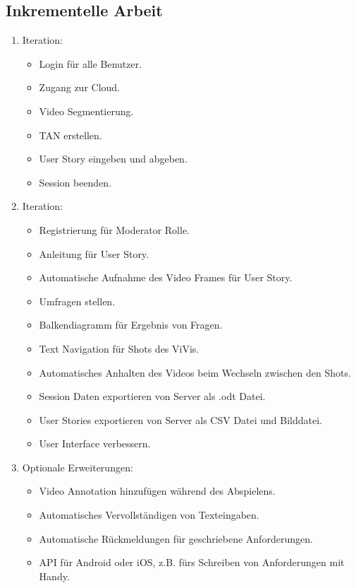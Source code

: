 	\subsection{Inkrementelle Arbeit}
		\begin{enumerate}
			\item Iteration:
			\begin{itemize}
				\item Login für alle Benutzer.
				\item Zugang zur Cloud.
				\item Video Segmentierung.
				\item TAN erstellen.
				\item User Story eingeben und abgeben.
				\item Session beenden.
			\end{itemize}
			\item Iteration:
			\begin{itemize}
				\item Registrierung für Moderator Rolle.
				\item Anleitung für User Story.
				\item Automatische Aufnahme des Video Frames für User Story.
				\item Umfragen stellen.
				\item Balkendiagramm für Ergebnis von Fragen.
				\item Text Navigation für Shots des ViVis.
				\item Automatisches Anhalten des Videos beim Wechseln zwischen den Shots.
				\item Session Daten exportieren von Server als .odt Datei.
				\item User Stories exportieren von Server als CSV Datei und Bilddatei.
				\item User Interface verbessern.
			\end{itemize}
			\item Optionale Erweiterungen:
			\begin{itemize}
				\item Video Annotation hinzufügen während des Abspielens.
				\item Automatisches Vervollständigen von Texteingaben.
				\item Automatische Rückmeldungen für geschriebene Anforderungen.
				\item API für Android oder iOS, z.B. fürs Schreiben von Anforderungen mit Handy.
			\end{itemize}
		\end{enumerate}


		